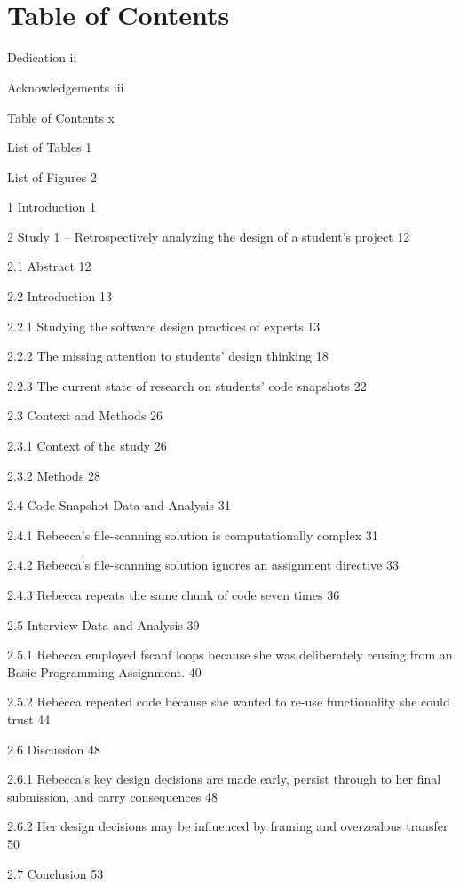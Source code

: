 \section{\texorpdfstring{\\
Table of Contents}{ Table of Contents}}\label{table-of-contents}

Dedication ii

Acknowledgements iii

Table of Contents x

List of Tables 1

List of Figures 2

1 Introduction 1

2 Study 1 -- Retrospectively analyzing the design of a student's project
12

2.1 Abstract 12

2.2 Introduction 13

2.2.1 Studying the software design practices of experts 13

2.2.2 The missing attention to students' design thinking 18

2.2.3 The current state of research on students' code snapshots 22

2.3 Context and Methods 26

2.3.1 Context of the study 26

2.3.2 Methods 28

2.4 Code Snapshot Data and Analysis 31

2.4.1 Rebecca's file-scanning solution is computationally complex 31

2.4.2 Rebecca's file-scanning solution ignores an assignment directive
33

2.4.3 Rebecca repeats the same chunk of code seven times 36

2.5 Interview Data and Analysis 39

2.5.1 Rebecca employed fscanf loops because she was deliberately reusing
from an Basic Programming Assignment. 40

2.5.2 Rebecca repeated code because she wanted to re-use functionality
she could trust 44

2.6 Discussion 48

2.6.1 Rebecca's key design decisions are made early, persist through to
her final submission, and carry consequences 48

2.6.2 Her design decisions may be influenced by framing and overzealous
transfer 50

2.7 Conclusion 53

